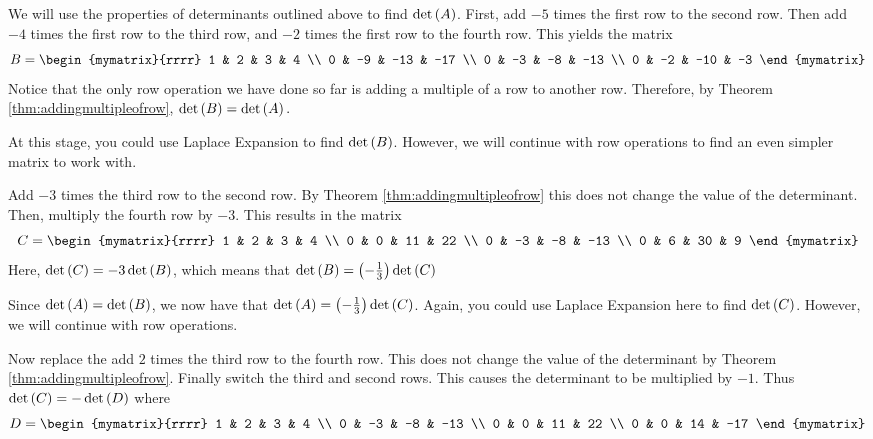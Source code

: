 \begin{solution}
We will use the properties of determinants outlined above to find $\det \left(A\right)$. First, add $-5$ times the first row to the second row. Then add $-4$ times the first row to the third row, and $-2$ times
the first row to the fourth row. This yields the matrix
\begin{equation*}
B=\begin{mymatrix}{rrrr}
1 & 2 & 3 & 4 \\
0 & -9 & -13 & -17 \\
0 & -3 & -8 & -13 \\
0 & -2 & -10 & -3
\end{mymatrix}
\end{equation*}
Notice that the only row operation we have done so far is adding a multiple 
of a row to another row. Therefore, by Theorem \ref{thm:addingmultipleofrow}, $\det \left(B\right) = \det \left(A\right).$ 

At this stage, you could use Laplace Expansion to find $\det \left(B\right)$. However, we will continue with row operations 
to find an even simpler matrix to work with.

Add $-3$ times the third row to the second row. By Theorem \ref{thm:addingmultipleofrow} this does not change the value of
the determinant. Then, multiply the fourth row by $-3$. This results in the matrix
\begin{equation*}
C=\begin{mymatrix}{rrrr}
1 & 2 & 3 & 4 \\
0 & 0 & 11 & 22 \\
0 & -3 & -8 & -13 \\
0 & 6 & 30 & 9
\end{mymatrix} 
\end{equation*}
Here, $\det \left(C\right) = -3 \det \left(B\right)$, which means that 
$\det \left(B\right) =\left(-\frac{1}{3}\right) \det \left(C\right) $

Since $\det \left(A\right) = \det \left(B\right)$, we now have that 
$\det \left(A\right) = \left(-\frac{1}{3}\right) \det \left(C\right)$. Again, you could use Laplace Expansion here to find $\det \left(C\right)$. However,
we will continue with row operations.

Now replace the add $2$ times the third row to the fourth row. This does not change the
value of the determinant by Theorem \ref{thm:addingmultipleofrow}. Finally switch the third
and second rows. This causes the determinant to be multiplied by $-1.$ Thus $\det \left(C\right) = -\det \left(D\right) $ where
\begin{equation*}
D=\begin{mymatrix}{rrrr}
1 & 2 & 3 & 4 \\
0 & -3 & -8 & -13 \\
0 & 0 & 11 & 22 \\
0 & 0 & 14 & -17
\end{mymatrix}
\end{equation*}


\end{solution}
